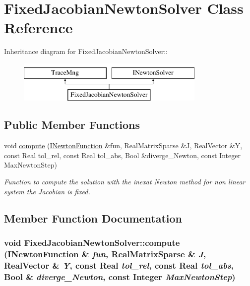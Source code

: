 \hypertarget{classFixedJacobianNewtonSolver}{
\section{FixedJacobianNewtonSolver Class Reference}
\label{classFixedJacobianNewtonSolver}
}
Inheritance diagram for FixedJacobianNewtonSolver::\begin{figure}[H]
\begin{center}
\leavevmode
\includegraphics[height=2cm]{classFixedJacobianNewtonSolver}
\end{center}
\end{figure}
\subsection*{Public Member Functions}
\begin{DoxyCompactItemize}
\item 
void \hyperlink{classFixedJacobianNewtonSolver_a0afd96a1a9a1622f27cbe7b3fa345d01}{compute} (\hyperlink{classINewtonFunction}{INewtonFunction} \&fun, RealMatrixSparse \&J, RealVector \&Y, const Real tol\_\-rel, const Real tol\_\-abs, Bool \&diverge\_\-Newton, const Integer MaxNewtonStep)
\begin{DoxyCompactList}\small\item\em Function to compute the solution with the inexat Newton method for non linear system the Jacobian is fixed. \item\end{DoxyCompactList}\end{DoxyCompactItemize}


\subsection{Member Function Documentation}
\hypertarget{classFixedJacobianNewtonSolver_a0afd96a1a9a1622f27cbe7b3fa345d01}{
\subsubsection[{compute}]{\setlength{\rightskip}{0pt plus 5cm}void FixedJacobianNewtonSolver::compute ({\bf INewtonFunction} \& {\em fun}, \/  RealMatrixSparse \& {\em J}, \/  RealVector \& {\em Y}, \/  const Real {\em tol\_\-rel}, \/  const Real {\em tol\_\-abs}, \/  Bool \& {\em diverge\_\-Newton}, \/  const Integer {\em MaxNewtonStep})}}
\label{classFixedJacobianNewtonSolver_a0afd96a1a9a1622f27cbe7b3fa345d01}


